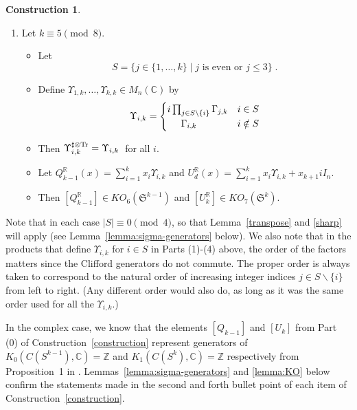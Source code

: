 \documentclass[12pt, reqno]{amsart}
\theoremstyle{definition}
\newtheorem{const}[thm]{Construction}
\def\R{{\mathbb R}}
\def\C{{\mathbb C}}
\def\Z{{\mathbb Z}}
\def\Up{{\Upsilon}}
\def\pr{^{\scriptscriptstyle \R}}
\def\sT{ ^{\sharp \otimes {\rm{Tr}}}}
\newcommand{\fS}{\mathfrak S}
\begin{document}
\begin{const}
\begin{enumerate}
\item[(4)] Let $k \equiv 5 \pmod 8$.
\begin{itemize}
\item Let $$  S=  \{j \in  \{1, \dots, k\} \mid \text{$j$ is even or $j \leq 3$} \}  \; . $$
\item Define $\Up_{1,k}, \dots, \Up_{k,k} \in M_n(\C)$ by
$$\Up_{i,k} =
	\begin{cases} 
			 i \prod_{ j \in S \backslash \{i\}} \Gamma_{j,k} & i \in S \\ \hspace{.5cm} \Gamma_{i,k} & i \notin S 
	\end{cases} $$
\item Then $\Up\sT_{i,k} =   \Up_{i,k} \; $ for all $i$.
\item Let $Q\pr_{k-1}(x) = \sum_{i = 1}^k x_i \Up_{i,k}$ and $U\pr_d(x) = \sum_{i = 1}^k x_i \Up_{i,k} + x_{k+1} i I_n$.
\item Then $[Q\pr_{k-1}] \in KO_{6}(\fS^{k-1})$ and $[U\pr_k] \in KO_{7}(\fS^{k})$.
\end{itemize}
\vspace{.5cm}
\end{enumerate}

Note that in each case $|S| \equiv 0 \pmod 4$, so that Lemma~\ref{transpose} and \ref{sharp} will apply (see Lemma~\ref{lemma:sigma-generators} below).
We also note that in the products that define $\Up_{i,k}$ for $i \in S$ in Parts (1)-(4) above, the order of the factors 
matters since the Clifford generators do not commute. The proper order is always taken to correspond to the natural order of increasing integer indices $j \in S \backslash \{ i \}$ from left to right. (Any different order would also do, as long as it was the same order used for all the $\Up_{i,k}$.)
\end{const}

In the complex case, we know that the elements $[Q_{k-1}]$ and $[U_k]$ from Part (0) of Construction~\ref{construction} represent generators of $K_{0}(C(S^{k-1}), \C) = \Z$ and $K_{1}(C(S^k), \C) = \Z$ respectively from Proposition~1 in \cite{SBS}. Lemmas~\ref{lemma:sigma-generators} and \ref{lemma:KO} below confirm the statements made in the second and forth bullet point of each item of Construction~\ref{construction}.
\end{document}
